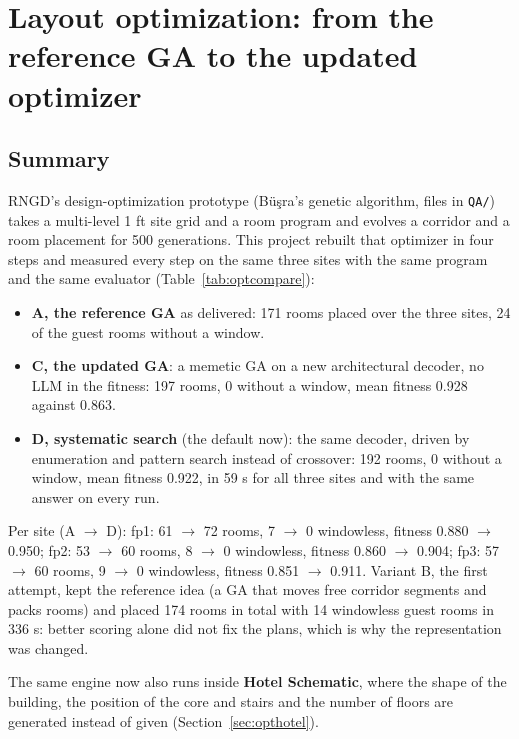 
\section{Layout optimization: from the reference GA to the updated optimizer}\label{sec:opt}
\subsection{Summary}
RNGD's design-optimization prototype (B\"u\c{s}ra's genetic algorithm, files in \texttt{QA/}) takes a multi-level 1 ft
site grid and a room program and evolves a corridor and a room placement for 500 generations. This project rebuilt
that optimizer in four steps and measured every step on the same three sites with the same program and the same evaluator
(Table~\ref{tab:optcompare}):
\begin{itemize}
\item \textbf{A, the reference GA} as delivered: 171 rooms placed over the three sites, 24 of the guest rooms without a window.
\item \textbf{C, the updated GA}: a memetic GA on a new architectural decoder, no LLM in the fitness: 197 rooms, 0 without a window, mean fitness 0.928 against 0.863.
\item \textbf{D, systematic search} (the default now): the same decoder, driven by enumeration and pattern search instead of crossover: 192 rooms, 0 without a window, mean fitness 0.922, in 59 s for all three sites and with the same answer on every run.
\end{itemize}
Per site (A $\to$ D): fp1: 61 $\to$ 72 rooms, 7 $\to$ 0 windowless, fitness 0.880 $\to$ 0.950; fp2: 53 $\to$ 60 rooms, 8 $\to$ 0 windowless, fitness 0.860 $\to$ 0.904; fp3: 57 $\to$ 60 rooms, 9 $\to$ 0 windowless, fitness 0.851 $\to$ 0.911. Variant B, the first attempt, kept the reference idea (a GA that moves free corridor segments and packs rooms) and placed 174 rooms in total with 14 windowless guest rooms in 336 s: better scoring alone did not fix the plans, which is why the representation was changed.

The same engine now also runs inside \textbf{Hotel Schematic}, where the shape of the building, the position of the
core and stairs and the number of floors are generated instead of given (Section~\ref{sec:opthotel}).

